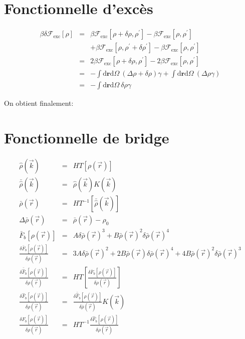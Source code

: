 \section{Fonctionnelle d'excès}
\label{sec:annexes:grad:exc}



\begin{eqnarray}
\beta \delta \mathcal{F}_\mathrm{exc}[\rho] &=& \beta \mathcal{F}_\mathrm{exc}[\rho + \delta \rho, \rho^\prime] -\beta \mathcal{F}_\mathrm{exc}[\rho, \rho^\prime] \\
& & + \beta \mathcal{F}_\mathrm{exc}[\rho, \rho^\prime + \delta \rho^\prime] -\beta \mathcal{F}_\mathrm{exc}[\rho, \rho^\prime] \nonumber\\
&=& 2 \beta \mathcal{F}_\mathrm{exc}[\rho + \delta \rho, \rho^\prime] - 2 \beta \mathcal{F}_\mathrm{exc}[\rho, \rho^\prime] \\
&=& -\int\mathrm{d}\boldsymbol{r}\mathrm{d}\Omega\ ( \Delta\rho+\delta\rho) \gamma  + \int\mathrm{d}\boldsymbol{r}\mathrm{d}\Omega\ ( \Delta\rho \gamma ) \\
&=& -\int\mathrm{d}\boldsymbol{r}\mathrm{d}\Omega\ \delta\rho \gamma
\end{eqnarray}

On obtient finalement:

\section{Fonctionnelle de bridge}
\label{sec:annexes:grad:bridge}
\begin{eqnarray}
\hat{\rho}(\vec{k})&=&HT[\rho(\vec{r})]  \\
\bar{\hat{\rho}}(\vec{k})&=&\hat{\rho}(\vec{k})K(\vec{k})   \\
\bar{\rho}(\vec{r})&=&HT^{-1}[\bar{\hat{\rho}}(\vec{k})]  \\
\Delta\bar{\rho}(\vec{r})&=&\bar{\rho}(\vec{r})-\rho_{0}  \\
\bar{F}_{b}[\rho(\vec{r})]&=&A\delta\bar{\rho}(\vec{r})^{3}+B\bar{\rho}(\vec{r})^{2}\delta\bar{\rho}(\vec{r})^{4}  \\
\frac{\delta\bar{F}_{b}[\rho(\vec{r})]}{\delta\rho(\vec{r})}&=&3A\delta\bar{\rho}(\vec{r})^{2}+2B\bar{\rho}(\vec{r})\delta\bar{\rho}(\vec{r})^{4}+4B\bar{\rho}(\vec{r})^{2}\delta\bar{\rho}(\vec{r})^{3}  \\
\frac{\delta\bar{\hat{F}}_{b}[\rho(\vec{r})]}{\delta\rho(\vec{r})}&=&HT[\frac{\delta\bar{F}_{b}[\rho(\vec{r})]}{\delta\rho(\vec{r})}]  \\
\frac{\delta\hat{F}_{b}[\rho(\vec{r})]}{\delta\rho(\vec{r})}&=&\frac{\delta\bar{\hat{F}}_{b}[\rho(\vec{r})]}{\delta\bar{\rho}(\vec{r})}K(\vec{k})  \\
\frac{\delta F_{b}[\rho(\vec{r})]}{\delta\rho(\vec{r})}&=&HT^{-1}\frac{\delta\hat{F}_{b}[\rho(\vec{r})]}{\delta\rho(\vec{r})} 
\end{eqnarray}



